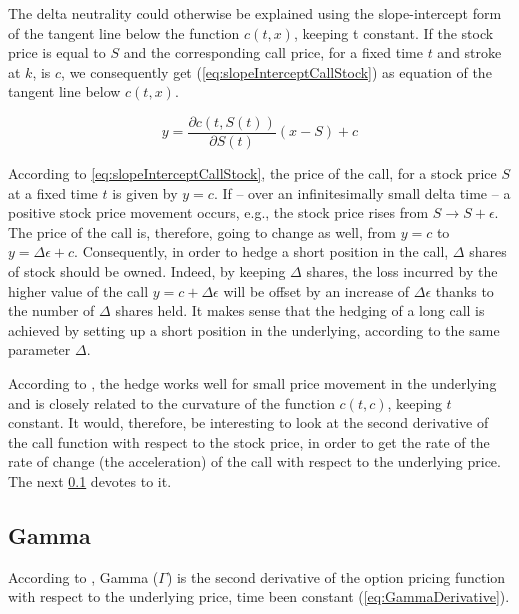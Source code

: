 \documentclass[a4paper, 12pt]{report}
\newcommand{\call}[2]{c\left( #1, #2\right)}
\newcommand{\St}{S\left(t\right)}
\begin{document}
The delta neutrality could otherwise be explained using the slope-intercept form of the tangent line below the function $\call{t}{x}$, keeping t constant. If the stock price is equal to $S$ and the corresponding call price, for a fixed time $t$ and stroke at $k$, is $c$, we consequently get (\ref{eq:slopeInterceptCallStock}) as equation of the tangent line below $\call{t}{x}$.
\begin{center}
  \begin{equation}
       y  =  \frac{\partial \call{t}{\St}}{\partial \St}  ( x - S) + c
       \label{eq:slopeInterceptCallStock}
  \end{equation}
\end{center}
According to \ref{eq:slopeInterceptCallStock}, the price of the call, for a stock price $S$ at a fixed time $t$ is given by $y = c$.
If -- over an infinitesimally small delta time -- a positive stock price movement occurs, e.g., the stock price rises from $S \to S + \epsilon$. The price of the call is, therefore, going to change as well, from $y = c$ to $y = \Delta \epsilon + c$.
Consequently, in order to hedge a short position in the call, $\Delta$ shares of stock should be owned. Indeed, by keeping $\Delta$ shares, the loss incurred by the higher value of the call $y = c + \Delta \epsilon$ will be offset by an increase of $\Delta \epsilon$ thanks to the number of $\Delta$ shares held.
It makes sense that the hedging of a long call is achieved by setting up a short position in the underlying, according to the same parameter $\Delta$.

According to \citet{shreve}, the hedge works well for small price movement in the underlying and is closely related to the curvature of the function $\call{t}{c}$, keeping $t$ constant.
It would, therefore, be interesting to look at the second derivative of the call function with respect to the stock price, in order to get the rate of the rate of change (the acceleration) of the call with respect to the underlying price.
The next \cref{sub:Gamma} devotes to it.


\subsection{Gamma}
\label{sub:Gamma}

According to \citet{shreve}, Gamma ($\Gamma$) is the second derivative of the option pricing function with respect to the underlying price, time been constant (\ref{eq:GammaDerivative}). 
\end{document}
